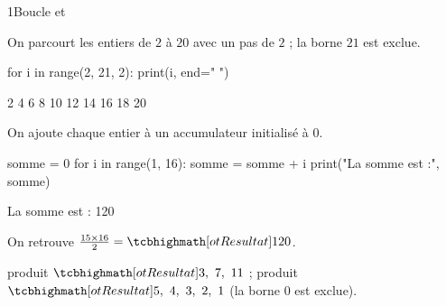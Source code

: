 
\corrigesSouples

\begin{corrige}{1}{Boucle  et }
\begin{questions}
  \item On parcourt les entiers de $2$ à $20$ avec un pas de $2$ ; la borne $21$ est exclue.
\begin{codecote}[0.44]
\begin{pythoncol}
for i in range(2, 21, 2):
    print(i, end=" ")
\end{pythoncol}
\cote
\begin{consolecol}
2 4 6 8 10 12 14 16 18 20
\end{consolecol}
\end{codecote}
  \item On ajoute chaque entier à un accumulateur initialisé à $0$.
\begin{codecote}[0.5]
\begin{pythoncol}
somme = 0
for i in range(1, 16):
    somme = somme + i
print("La somme est :", somme)
\end{pythoncol}
\cote
\begin{consolecol}
La somme est : 120
\end{consolecol}

\medskip
On retrouve $\frac{15\times16}{2}=\res{120}$.
\end{codecote}
  \item {} produit $\res{3,\ 7,\ 11}$ ;  produit $\res{5,\ 4,\ 3,\ 2,\ 1}$ (la borne $0$ est exclue).
\end{questions}
\end{corrige}

